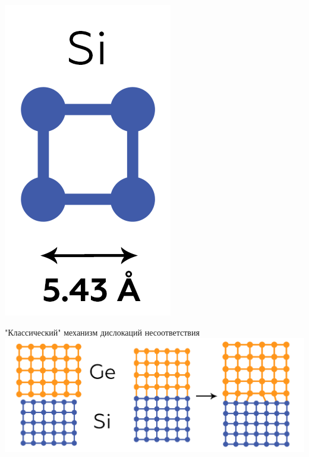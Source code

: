\documentclass[10pt,pdf,hyperref={unicode}, dvipsnames]{beamer}
\begin{document}
\begin{frame}[t]
\begin{minipage}{0.15\linewidth}
		\includegraphics[width=\linewidth]{imgs/Sicell.png}
		\vfill
	\end{minipage}
	\begin{minipage}{0.84\linewidth}
	\centering
		
		"Классический" механизм дислокаций несоответствия
		\includegraphics[width = \linewidth]{imgs/1st.png}
		

\end{minipage}
\end{frame}
\end{document}
